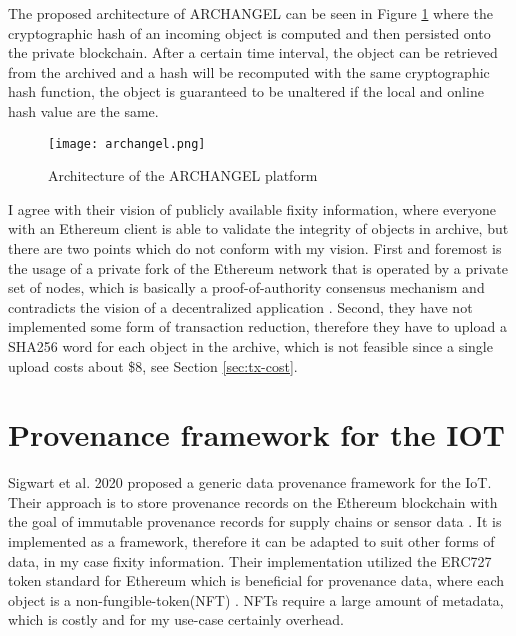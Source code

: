 The proposed architecture of ARCHANGEL can be seen in Figure \ref{fig:archangel} where the cryptographic hash of an incoming object is computed and then persisted onto the private blockchain. After a certain time interval, the object can be retrieved from the archived and a hash will be recomputed with the same cryptographic hash function, the object is guaranteed to be unaltered if the local and online hash value are the same.
\begin{figure}[h]
    \caption{Architecture of the ARCHANGEL platform \cite[2]{collomosse2018archangel}}
    \centering
    \texttt{[image: archangel.png]}\label{fig:archangel}
\end{figure}
I agree with their vision of publicly available fixity information, where everyone with an Ethereum client is able to validate the integrity of objects in archive, but there are two points which do not conform with my vision. First and foremost is the usage of a private fork of the Ethereum network that is operated by a private set of nodes, which is basically a proof-of-authority consensus mechanism and contradicts the vision of a decentralized application \cite[3]{collomosse2018archangel}. Second, they have not implemented some form of transaction reduction, therefore they have to upload a SHA256 word for each object in the archive, which is not feasible since a single upload costs about \$8, see Section \ref{sec:tx-cost}. 

\section{Provenance framework for the IOT}
Sigwart et al. 2020 proposed a generic data provenance framework for the IoT. Their approach is to store provenance records on the Ethereum blockchain with the goal of immutable provenance records for supply chains or sensor data \cite[4]{Sigwart2020}. It is implemented as a framework, therefore it can be adapted to suit other forms of data, in my case fixity information. Their implementation utilized the ERC727 token standard for Ethereum which is beneficial for provenance data, where each object is a non-fungible-token(NFT) \cite[7]{Sigwart2020}. NFTs require a large amount of metadata, which is costly and for my use-case certainly overhead. 

